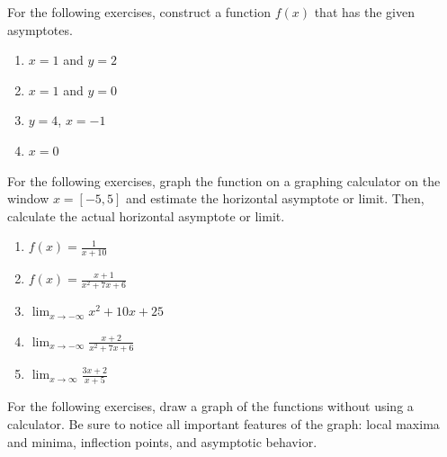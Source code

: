 \documentclass{exercises}
\begin{document}
For the following exercises, construct a function $f(x)$ that has the given asymptotes.

\begin{enumerate}[resume]
\item $x=1$ and $y=2$
\item $x=1$ and $y=0$
\item $y=4$, $x=-1$
\item $x=0$
\end{enumerate}

For the following exercises, graph the function on a graphing calculator on the window $x=[-5,5]$ and estimate the horizontal asymptote or limit. Then, calculate the actual horizontal asymptote or limit.

\begin{enumerate}[resume]
\item \techrequired $f(x)=\frac{1}{x+10}$
\item \techrequired $f(x)=\frac{x+1}{x^{2}+7x+6}$
\item \techrequired $\lim_{x\to-\infty}x^{2}+10x+25$
\item \techrequired $\lim_{x\to-\infty}\frac{x+2}{x^{2}+7x+6}$
\item \techrequired $\lim_{x\to \infty}\frac{3x+2}{x+5}$
\end{enumerate}

For the following exercises, draw a graph of the functions without using a calculator. Be sure to notice all important features of the graph: local maxima and minima, inflection points, and asymptotic behavior.
\end{document}
